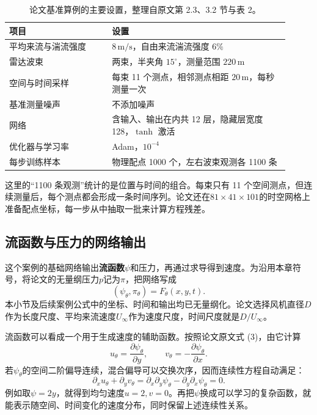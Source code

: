 \begin{table}[htbp]
\centering\small
\caption{论文基准算例的主要设置，整理自原文第 2.3、3.2 节与表 2\cite{zhang2021spatiotemporal}。}
\label{tab:pinn-zhang-setup}
\begin{tabular}{m{0.33\linewidth}m{0.58\linewidth}}
\toprule
项目 & 设置\\
\midrule
平均来流与湍流强度 & $8\,\mathrm{m/s}$，自由来流湍流强度 $6\%$\\
雷达波束 & 两束，半夹角 $15^\circ$，测量范围 $220\,\mathrm{m}$\\
空间与时间采样 & 每束 11 个测点，相邻测点相距 $20\,\mathrm{m}$，每秒测量一次\\
基准测量噪声 & 不添加噪声\\
网络 & 含输入、输出在内共 12 层，隐藏层宽度 128，$\tanh$ 激活\\
优化器与学习率 & Adam，$10^{-4}$\\
每步训练样本 & 物理配点 1000 个，左右波束观测各 1100 条\\
\bottomrule
\end{tabular}
\end{table}

这里的“1100 条观测”统计的是位置与时间的组合。每束只有 11 个空间测点，但连续测量后，每个测点都会形成一条时间序列。论文还在$81\times41\times101$的时空网格上准备配点坐标，每一步从中抽取一批来计算方程残差。

\subsection{流函数与压力的网络输出}
这个案例的基础网络输出\textbf{流函数}$\psi$和压力，再通过求导得到速度。为沿用本章符号，将论文的无量纲压力$p$记为$\pi$，把网络写成
\begin{equation}
 (\psi_\theta,\pi_\theta)=F_\theta(x,y,t).
 \label{eq:pinn-zhang-network}
\end{equation}
本小节及后续案例公式中的坐标、时间和输出均已无量纲化。论文选择风机直径$D$作为长度尺度、平均来流速度$U_\infty$作为速度尺度，时间尺度就是$D/U_\infty$。

流函数可以看成一个用于生成速度的辅助函数。按照论文原文式 (3)，由它计算
\begin{equation}
 u_\theta=\frac{\partial\psi_\theta}{\partial y},\qquad
 v_\theta=-\frac{\partial\psi_\theta}{\partial x}.
 \label{eq:pinn-zhang-streamfunction}
\end{equation}
若$\psi_\theta$的空间二阶偏导连续，混合偏导可以交换次序，因而连续性方程自动满足：
\[
 \partial_xu_\theta+\partial_yv_\theta
 =\partial_x\partial_y\psi_\theta-\partial_y\partial_x\psi_\theta=0.
\]
例如取$\psi=2y$，就得到均匀速度$u=2,v=0$。再把$\psi$换成可以学习的复杂函数，就能表示随空间、时间变化的速度分布，同时保留上述连续性关系。

